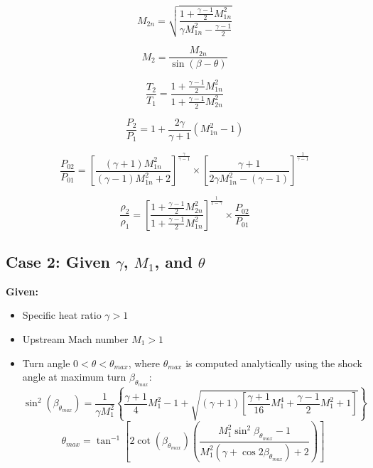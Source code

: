 \begin{equation}
M_{2n} = \sqrt{\frac{1+\frac{\gamma-1}{2}M_{1n}^2}{\gamma M_{1n}^2 - \frac{\gamma-1}{2}}}
\end{equation}

\begin{equation}
M_2 = \frac{M_{2n}}{\sin(\beta-\theta)}
\end{equation}

\begin{equation}
\frac{T_2}{T_1} = \frac{1+\frac{\gamma-1}{2}M_{1n}^2}{1+\frac{\gamma-1}{2}M_{2n}^2}
\end{equation}

\begin{equation}
\frac{P_2}{P_1} = 1 + \frac{2\gamma}{\gamma+1}(M_{1n}^2-1)
\end{equation}

\begin{equation}
\frac{P_{02}}{P_{01}} = \left[\frac{(\gamma+1)M_{1n}^2}{(\gamma-1)M_{1n}^2+2}\right]^{\frac{\gamma}{\gamma-1}}\times\left[\frac{\gamma+1}{2\gamma M_{1n}^2-(\gamma-1)}\right]^{\frac{1}{\gamma-1}}
\end{equation}

\begin{equation}
\frac{\rho_2}{\rho_1} = \left[\frac{1+\frac{\gamma-1}{2}M_{2n}^2}{1+\frac{\gamma-1}{2}M_{1n}^2}\right]^{\frac{1}{1-\gamma}}\times\frac{P_{02}}{P_{01}}
\end{equation}


\subsection*{Case 2: Given $\gamma$, $M_1$, and $\theta$}

\textbf{Given:}
\begin{itemize}[nosep]
    \item Specific heat ratio $\gamma > 1$
    \item Upstream Mach number $M_1 > 1$
    \item Turn angle $0 < \theta < \theta_{max}$, where $\theta_{max}$ is computed analytically using the shock angle at maximum turn $\beta_{\theta_{max}}$:
    \begin{equation}
    \sin^2(\beta_{\theta_{max}}) = \frac{1}{\gamma M_1^2}\left\{\frac{\gamma+1}{4}M_1^2-1+\sqrt{(\gamma+1)\left[\frac{\gamma+1}{16}M_1^4+\frac{\gamma-1}{2}M_1^2+1\right]}\right\}
    \end{equation}
    \begin{equation}
    \theta_{max} = \tan^{-1}\left[2\cot(\beta_{\theta_{max}})\left(\frac{M_1^2\sin^2\beta_{\theta_{max}}-1}{M_1^2(\gamma+\cos2\beta_{\theta_{max}})+2}\right)\right]
    \end{equation}
\end{itemize}

